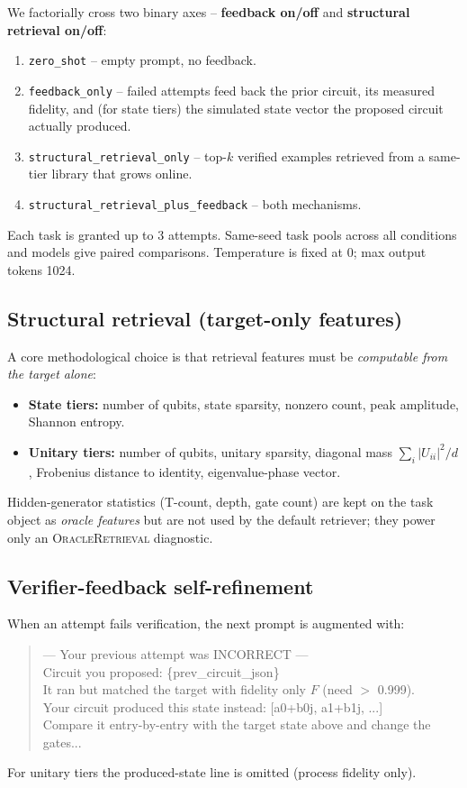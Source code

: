 \documentclass[11pt]{article}
\begin{document}
We factorially cross two binary axes -- \textbf{feedback on/off} and \textbf{structural retrieval on/off}:
\begin{enumerate}[leftmargin=*,topsep=2pt,itemsep=0pt]
    \item \texttt{zero\_shot} -- empty prompt, no feedback.
    \item \texttt{feedback\_only} -- failed attempts feed back the prior circuit, its measured fidelity, and (for state tiers) the simulated state vector the proposed circuit actually produced.
    \item \texttt{structural\_retrieval\_only} -- top-$k$ verified examples retrieved from a same-tier library that grows online.
    \item \texttt{structural\_retrieval\_plus\_feedback} -- both mechanisms.
\end{enumerate}
Each task is granted up to 3 attempts. Same-seed task pools across all conditions and models give paired comparisons. Temperature is fixed at 0; max output tokens 1024.

\subsection{Structural retrieval (target-only features)}

A core methodological choice is that retrieval features must be \emph{computable from the target alone}:
\begin{itemize}[leftmargin=*,topsep=2pt,itemsep=0pt]
    \item \textbf{State tiers:} number of qubits, state sparsity, nonzero count, peak amplitude, Shannon entropy.
    \item \textbf{Unitary tiers:} number of qubits, unitary sparsity, diagonal mass $\sum_i |U_{ii}|^2/d$, Frobenius distance to identity, eigenvalue-phase vector.
\end{itemize}
Hidden-generator statistics (T-count, depth, gate count) are kept on the task object as \emph{oracle features} but are not used by the default retriever; they power only an \textsc{OracleRetrieval} diagnostic.

\subsection{Verifier-feedback self-refinement}

When an attempt fails verification, the next prompt is augmented with:
\begin{quote}\small\ttfamily
--- Your previous attempt was INCORRECT --- \\
Circuit you proposed: \{prev\_circuit\_json\} \\
It ran but matched the target with fidelity only $F$ (need $>$ 0.999). \\
Your circuit produced this state instead: [a0+b0j, a1+b1j, ...] \\
Compare it entry-by-entry with the target state above and change the gates...
\end{quote}
For unitary tiers the produced-state line is omitted (process fidelity only).
\end{document}
